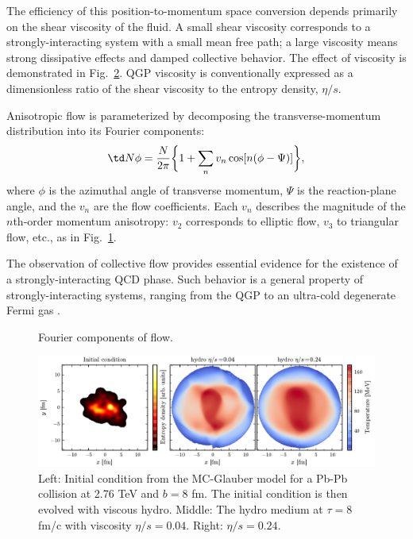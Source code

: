 \documentclass[reprint,amsmath]{revtex4-1}
\begin{document}
The efficiency of this position-to-momentum space conversion depends primarily on the shear viscosity of the fluid.  A small shear viscosity
corresponds to a strongly-interacting system with a small mean free path; a large viscosity means strong dissipative effects and damped
collective behavior.  The effect of viscosity is demonstrated in Fig.\ \ref{fig:ichydro}.  QGP viscosity is conventionally expressed as a
dimensionless ratio of the shear viscosity to the entropy density, $\eta/s$.

Anisotropic flow is parameterized by decomposing the transverse-momentum distribution into its Fourier components:
\begin{equation}
  \td N \phi = \frac{N}{2\pi} \biggl\{ 1 + \sum_n v_n \cos [ n(\phi - \Psi) ] \biggr\},
\end{equation}
where $\phi$ is the azimuthal angle of transverse momentum, $\Psi$ is the reaction-plane angle, and the $v_n$ are the flow coefficients.
Each $v_n$ describes the magnitude of the $n$th-order momentum anisotropy:  $v_2$ corresponds to elliptic flow, $v_3$ to triangular flow,
etc., as in Fig.\ \ref{fig:fourier}.

The observation of collective flow provides essential evidence for the existence of a strongly-interacting QCD phase.  Such behavior is a general property of
strongly-interacting systems, ranging from the QGP to an ultra-cold degenerate Fermi gas \cite{fermi}.

\begin{figure}[b]
  \centering
  \caption{Fourier components of flow.}
  \label{fig:fourier}
\end{figure}



\begin{figure}[t]
  \centering
  \includegraphics{glb-hydro}
  \caption{Left:  Initial condition from the MC-Glauber model for a Pb-Pb collision at 2.76 TeV and $b = 8$ fm.  The initial condition is
    then evolved with viscous hydro.  Middle:  The hydro medium at $\tau = 8$ fm/c with viscosity $\eta/s = 0.04$.  Right:  $\eta/s = 0.24$.}
  \label{fig:ichydro}
\end{figure}
\end{document}
